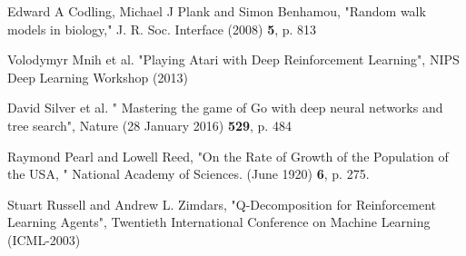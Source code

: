 \documentclass[a4paper,prd,twocolumn,nofootinbib,superscriptaddress,floatfix]{revtex4}
\begin{document}
\begin{thebibliography}{99}
    \scriptsize
{}
  Edward A Codling, Michael J Plank and Simon Benhamou,
  "Random walk models in biology,"
  J. R. Soc. Interface (2008) {\bf 5}, p. 813
 
Volodymyr Mnih et al. 
"Playing Atari with Deep Reinforcement Learning",
 NIPS Deep Learning Workshop (2013)

 David Silver et al. 
" Mastering the game of Go with deep neural networks and tree search",
Nature (28 January 2016) {\bf {529}}, p. 484

   Raymond Pearl and Lowell Reed, 
   "On the Rate of Growth of the Population of the USA, " 
  National Academy of Sciences. (June 1920) {\bf 6}, p. 275.
   
 Stuart Russell and Andrew L. Zimdars,
 "Q-Decomposition for Reinforcement Learning Agents",
  Twentieth International Conference on Machine Learning (ICML-2003)
 

\end{thebibliography}
\end{document}
